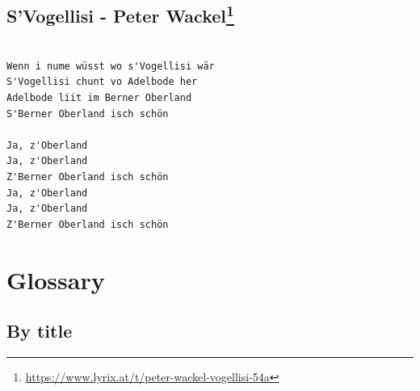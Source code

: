\documentclass[
]{book}
\let\stdsection\section
\renewcommand\section{\clearpage\stdsection}
\begin{document}
\hypertarget{kinderlieder-vogellisi}{%
\section[S'Vogellisi - Peter Wackel]{\texorpdfstring{S'Vogellisi - Peter Wackel\footnote{\url{https://www.lyrix.at/t/peter-wackel-vogellisi-54a}}}{S'Vogellisi - Peter Wackel}}\label{kinderlieder-vogellisi}}

\begin{verbatim}

Wenn i nume wüsst wo s'Vogellisi wär
S'Vogellisi chunt vo Adelbode her
Adelbode liit im Berner Oberland
S'Berner Oberland isch schön

Ja, z'Oberland
Ja, z'Oberland
Z'Berner Oberland isch schön
Ja, z'Oberland
Ja, z'Oberland
Z'Berner Oberland isch schön
\end{verbatim}

\hypertarget{glossary}{%
\chapter{Glossary}\label{glossary}}

\hypertarget{by-title}{%
\section{By title}\label{by-title}}
\end{document}
